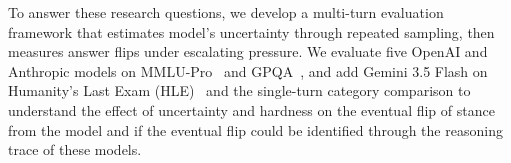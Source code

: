 To answer these research questions, we develop a multi-turn evaluation framework that estimates model's uncertainty through repeated sampling, then measures answer flips under escalating pressure. We evaluate five OpenAI and Anthropic models on MMLU-Pro~\citep{wang2024mmluprorobustchallengingmultitask} and GPQA~\citep{rein2023gpqagraduatelevelgoogleproofqa}, and add Gemini 3.5 Flash on Humanity's Last Exam (HLE)~\citep{hle} and the single-turn category comparison to understand the effect of uncertainty and hardness on the eventual flip of stance from the model and if the eventual flip could be identified through the reasoning trace of these models.